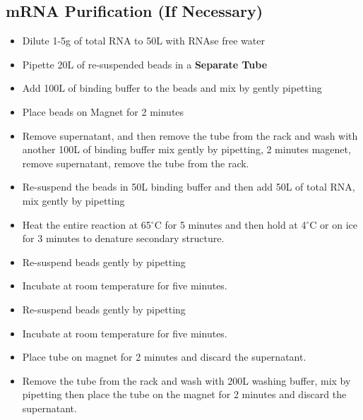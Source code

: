 \documentclass[a4paper]{article}
\begin{document}
    \subsection{mRNA Purification (If Necessary)}
    	\begin{itemize}
			
        	\item Dilute 1-5\textmu g of total RNA to 50\textmu L with RNAse free water
            
            \item Pipette 20\textmu L of re-suspended beads in a \textbf{Separate Tube}
            
            \item Add 100\textmu L of binding buffer to the beads and mix by gently pipetting
            
            \item Place beads on Magnet for 2 minutes
            
            \item Remove supernatant, and then remove the tube from the rack and wash with another 100\textmu L of binding buffer mix gently by pipetting, 2 minutes magenet, remove supernatant, remove the tube from the rack.
            
            \item Re-suspend the beads in 50\textmu L binding buffer and then add 50\textmu L of total RNA, mix gently by pipetting
            
            \item Heat the entire reaction at 65$^{\circ}$C for 5 minutes and then hold at 4$^{\circ}$C or on ice for 3 minutes to denature secondary structure.
            
            \item Re-suspend beads gently by pipetting 
            
            \item Incubate at room temperature for five minutes.
            
            \item Re-suspend beads gently by pipetting 
            
            \item Incubate at room temperature for five minutes.
            
            \item Place tube on magnet for 2 minutes and discard the supernatant.
            
            \item Remove the tube from the rack and wash with 200\textmu L washing buffer, mix by pipetting then place the tube on the magnet for 2 minutes and discard the supernatant.
            

\end{itemize}
\end{document}
